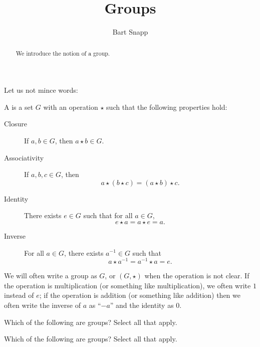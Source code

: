 \documentclass{ximera}
\author{Bart Snapp}
\title{Groups}
\begin{document}
\begin{abstract}
  We introduce the notion of a group.
\end{abstract}
\maketitle

Let us not mince words:

\begin{definition}
  A  is a set $G$ with an operation $\star$ such that the
  following properties hold:
  \begin{description}
  \item[Closure] If $a,b\in G$, then $a\star b\in G$.
  \item[Associativity] If $a,b,c\in G$, then
    \[
    a\star(b\star c)  = (a\star b)\star c.
    \]
  \item[Identity] There exists $e\in G$ such that for all $a\in G$, 
    \[
    e\star a = a \star e  = a.
    \]
  \item[Inverse] For all $a\in G$, there exists $a^{-1}\in G$ such that
    \[
    a\star a^{-1} = a^{-1}\star a = e.
    \]
  \end{description}
  We will often write a group as $G$, or $(G,\star)$ when the
  operation is not clear. If the operation is multiplication (or
  something like multiplication), we often write $1$ instead of $e$;
  if the operation is addition (or something like addition) then we
  often write the inverse of $a$ as ``$-a$'' and the identity as $0$.
\end{definition}

\begin{exercise} %
  Which of the following are groups? Select all that apply.
  \begin{selectAll}
  \end{selectAll}
\end{exercise}

\begin{exercise} %
  Which of the following are groups? Select all that apply.
  \begin{selectAll}
  \end{selectAll}
\end{exercise}
\end{document}
